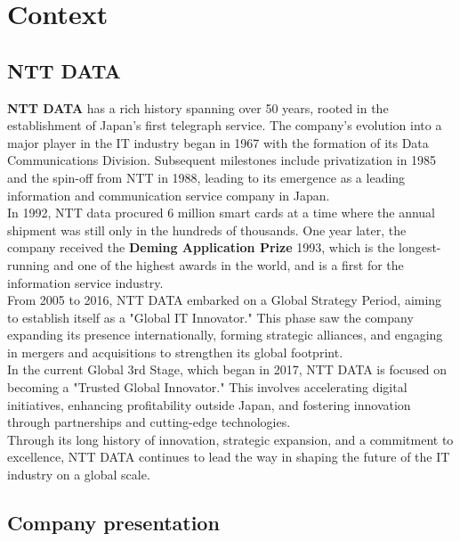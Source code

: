 \section{Context}

\subsection{NTT DATA}

\textbf{NTT DATA} has a rich history spanning over 50 years, rooted in the establishment of Japan's first telegraph service. The company's evolution into a major player in the IT industry began in 1967 with the formation of its Data Communications Division. Subsequent milestones include privatization in 1985 and the spin-off from NTT in 1988, leading to its emergence as a leading information and communication service company in Japan.\\

In 1992, NTT data procured 6 million smart cards at a time where the annual shipment was still only in the hundreds of thousands. One year later, the company received the \textbf{Deming Application Prize} 1993, which  is the longest-running and one of the highest awards in the world,  and is a first for the information service industry.\\

From 2005 to 2016, NTT DATA embarked on a Global Strategy Period, aiming to establish itself as a "Global IT Innovator." This phase saw the company expanding its presence internationally, forming strategic alliances, and engaging in mergers and acquisitions to strengthen its global footprint.\\

In the current Global 3rd Stage, which began in 2017, NTT DATA is focused on becoming a "Trusted Global Innovator." This involves accelerating digital initiatives, enhancing profitability outside Japan, and fostering innovation through partnerships and cutting-edge technologies. \\

Through its long history of innovation, strategic expansion, and a commitment to excellence, NTT DATA continues to lead the way in shaping the future of the IT industry on a global scale.\\

\newpage
\subsection{Company presentation}

